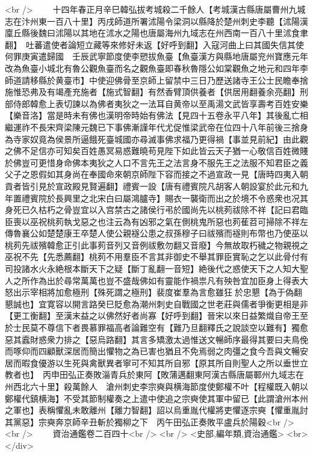 <br />
　　十四年春正月辛巳韓弘拔考城殺二千餘人【考城漢古縣唐屬曹州九城志在汴州東一百八十里】丙戌師道所署沭陽令梁洞以縣降於楚州刺史李聽【沭陽漢廩丘縣後魏曰沭陽以其地在沭水之陽也唐屬海州九域志在州西南一百八十里沭食聿翻】　吐蕃遣使者論短立藏等來修好未返【好呼到翻】入寇河曲上曰其國失信其使何罪庚寅遣歸國　壬辰武寧節度使李愬拔魚臺【魚臺漢方與縣地唐屬兖州寶應元年改為魚臺小城北有魯公觀魚臺而名之觀魚臺即春秋魯隱公如棠觀魚之地元和四年李師道請移縣於黄臺市】中使迎佛骨至京師上留禁中三日乃歷送諸寺王公士民瞻奉捨施惟恐弗及有竭產充施者【施式智翻】有然香臂頂供養者【供居用翻養余亮翻】刑部侍郎韓愈上表切諫以為佛者夷狄之一法耳自黄帝以至禹湯文武皆享壽考百姓安樂【樂音洛】當是時未有佛也漢明帝時始有佛法【見四十五卷永平八年】其後亂亡相繼運祚不長宋齊梁陳元魏已下事佛漸謹年代尤促惟梁武帝在位四十八年前後三捨身為寺家奴竟為侯景所逼餓死臺城國亦尋滅事佛求福乃更得禍【事並見前紀】由此觀之佛不足信亦可知矣百姓愚冥易惑難曉苟見陛下如此皆云天子猶一心敬信百姓微賤於佛豈可更惜身命佛本夷狄之人口不言先王之法言身不服先王之法服不知君臣之義父子之恩假如其身尚在奉國命來朝京師陛下容而接之不過宣政一見【唐時四夷入朝貢者皆引見於宣政殿見賢遍翻】禮賓一設【唐有禮賓院凡胡客人朝設宴於此元和九年置禮賓院於長興里之北宋白曰屬鴻臚寺】賜衣一襲衛而出之於境不令惑衆也况其身死已久枯朽之骨豈宜以入宫禁古之諸侯行弔於國尚先以桃茢祓除不祥【記曰君臨臣喪以巫祝桃茢執戈惡之也注云為有凶邪之氣在側桃鬼所惡也茢萑苕可掃除不祥左傳魯襄公如楚楚康王卒楚人使公親襚公患之叔孫穆子曰祓殯而襚則布幣也乃使巫以桃茢先祓殯韓愈正引此事茢音列又音例祓敷勿翻又音廢】今無故取朽穢之物親視之巫祝不先【先悉薦翻】桃茢不用羣臣不言其非御史不舉其罪臣實恥之乞以此骨付有司投諸水火永絶根本斷天下之疑【斷丁亂翻一音短】絶後代之惑使天下之人知大聖人之所作為出於尋常萬萬也豈不盛哉佛如有靈能作禍祟凡有殃咎宜加臣身上得表大怒出示宰相將加愈極刑【殊死謂之極刑】裴度崔羣為言愈雖狂於忠懇【為于偽翻懇誠也】宜寛容以開言路癸巳貶愈為潮州刺史自戰國之世老莊與儒者爭衡更相是非【更工衡翻】至漢末益之以佛然好者尚寡【好呼到翻】晉宋以來日益繁熾自帝王至於士民莫不尊信下者畏慕罪福高者論難空有【難乃旦翻釋氏之說談空以難有】獨愈惡其蠧財惑衆力排之【惡烏路翻】其言多矯激太過惟送文暢師序最得其要曰夫鳥俛而啄仰而四顧獸深居而簡出懼物之為已害也猶且不免焉弱之肉彊之食今吾與文暢安居而暇食優游以生死與禽獸異者寧可不知其所自邪【原其所自則聖人之所以垂世立教者也】　丙申田弘正奏敗淄青兵於東阿【敗蒲邁翻東阿漢古縣唐屬鄆州九域志在州西北六十里】殺萬餘人　滄州刺史李宗奭與横海節度使鄭權不叶【程權既入朝以鄭權代鎮横海】不受其節制權奏之上遣中使追之宗奭使其軍中留已【此謂滄州本州之軍也】表稱懼亂未敢離州【離力智翻】詔以烏重胤代權將吏懼逐宗奭【懼重胤討其黨惡】宗奭奔京師辛丑斬於獨柳之下　丙午田弘正奏敗平盧兵於陽穀<br />
<br />
　　資治通鑑卷二百四十<br />
<br />
<史部,編年類,資治通鑑>  <br>
   </div> 

